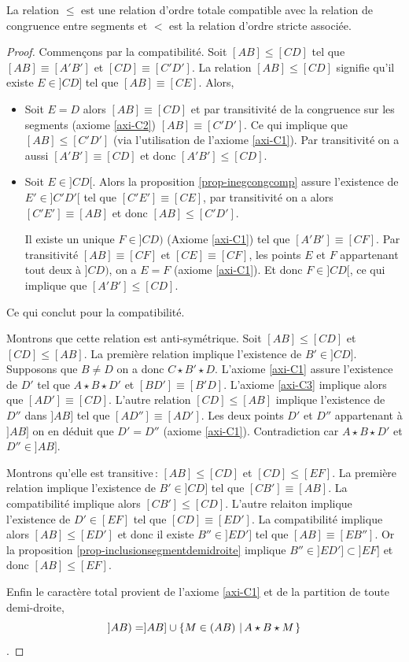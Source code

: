 \begin{thm}\label{thm-relationordretotal}
    La relation $\leq$ est une relation d'ordre totale compatible avec la relation de congruence entre segments et $<$ est la relation d'ordre stricte associée. 
\begin{proof}
    Commençons par la compatibilité. Soit $[AB]\leq [CD]$ tel que $[AB]\equiv [A'B']$ et $[CD]\equiv [C'D']$. La relation $[AB]\leq [CD]$ signifie qu'il existe $E\in ]CD]$ tel que $[AB]\equiv [CE]$. Alors, 
    \begin{itemize}[$\bullet$]
        \item Soit  $E = D$ alors $[AB]\equiv [CD]$ et par transitivité de la congruence sur les segments (axiome \ref{axi-C2}) $[AB]\equiv [C'D']$. Ce qui implique que $[AB] \leq [C'D']$ (via l'utilisation de l'axiome \ref{axi-C1}). Par transitivité on a aussi $[A'B']\equiv [CD]$ et donc $[A'B']\leq [CD]$. 
        \item Soit $E\in ]CD[$. Alors la proposition \ref{prop-inegcongcomp} assure l'existence de $E'\in ]C'D'[$ tel que $[C'E']\equiv [CE]$, par transitivité on a alors $[C'E']\equiv [AB]$ et donc $[AB]\leq [C'D']$. 

        Il existe un unique $F\in ]CD)$ (Axiome \ref{axi-C1}) tel que $[A'B']\equiv [CF]$. Par transitivité $[AB]\equiv [CF]$ et $[CE]\equiv [CF]$, les points $E$ et $F$ appartenant tout deux à $]CD)$, on a $E=F$ (axiome \ref{axi-C1}). Et donc $F\in ]CD[$, ce qui implique que $[A'B'] \leq [CD]$.  
    \end{itemize}
    Ce qui conclut pour la compatibilité.

    Montrons que cette relation est anti-symétrique. Soit $[AB]\leq [CD]$ et $[CD]\leq [AB]$. La première relation implique l'existence de $B'\in ]CD]$. Supposons que $B\neq D$ on a donc $C\star B' \star D$. L'axiome \ref{axi-C1} assure l'existence de $D'$ tel que $A\star B\star D'$ et $[BD']\equiv [B'D]$. L'axiome \ref{axi-C3} implique alors que $[AD']\equiv [CD]$. L'autre relation $[CD]\leq [AB]$ implique l'existence de $D''$ dans $]AB]$ tel que $[AD'']\equiv [AD']$. Les deux points $D'$ et $D''$ appartenant à $]AB]$ on en déduit que $D'=D''$ (axiome \ref{axi-C1}). Contradiction car $A\star B\star D'$ et $D''\in ]AB]$. 

    Montrons qu'elle est transitive\,: $[AB]\leq [CD] $ et $[CD] \leq [EF]$. La première relation implique l'existence de $B'\in ]CD]$ tel que $[CB']\equiv [AB]$. La compatibilité implique alors $[CB']\leq [CD]$. L'autre relaiton implique l'existence de $D'\in [EF]$ tel que $[CD]\equiv [ED']$. La compatibilité implique alors $[AB]\leq [ED']$ et donc il existe $B''\in ]ED']$ tel que $[AB]\equiv [EB'']$. Or la proposition \ref{prop-inclusionsegmentdemidroite} implique $B''\in ]ED']\subset ]EF]$ et donc $[AB]\leq [EF]$.

    Enfin le caractère total provient de l'axiome \ref{axi-C1} et de la partition de toute demi-droite, $$]AB)=]AB]\cup\left\{M\in (AB)\,\left|\,A\star B\star M\right.\right\}$$.
\end{proof}
\end{thm}
    
